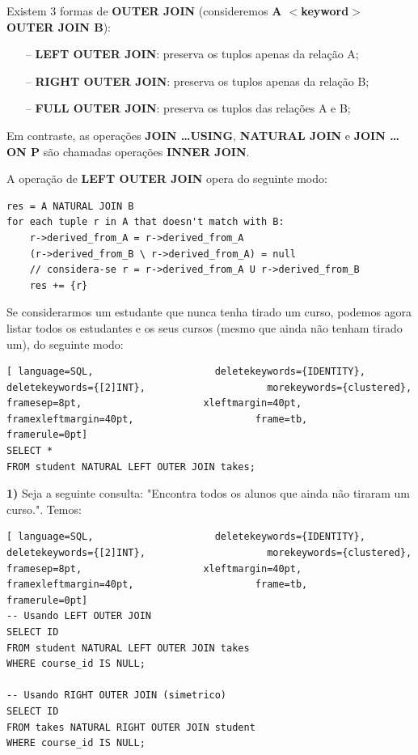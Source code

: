 \documentclass[titlepage]{book}
\theoremstyle{definition}
\begin{document}
Existem 3 formas de \textbf{OUTER JOIN} (consideremos \textbf{A $<$keyword$>$ OUTER JOIN B}):
\begin{itemize}
    \itemsep0cm
    \item[--]\textbf{LEFT OUTER JOIN}: preserva os tuplos apenas da relação A;
    \item[--]\textbf{RIGHT OUTER JOIN}: preserva os tuplos apenas da relação B;
    \item[--]\textbf{FULL OUTER JOIN}: preserva os tuplos das relações A e B;
\end{itemize}

Em contraste, as operações \textbf{JOIN \dots USING}, \textbf{NATURAL JOIN} e \textbf{JOIN \dots ON P} são chamadas operações \textbf{INNER JOIN}.

A operação de \textbf{LEFT OUTER JOIN} opera do seguinte modo:
\begin{verbatim}
res = A NATURAL JOIN B
for each tuple r in A that doesn't match with B:
    r->derived_from_A = r->derived_from_A
    (r->derived_from_B \ r->derived_from_A) = null
    // considera-se r = r->derived_from_A U r->derived_from_B
    res += {r}
\end{verbatim}

Se considerarmos um estudante que nunca tenha tirado um curso, podemos agora listar todos os estudantes e os seus cursos (mesmo que ainda não tenham tirado um), do seguinte modo:
\begin{lstlisting}[ language=SQL,                     deletekeywords={IDENTITY},                     deletekeywords={[2]INT},                     morekeywords={clustered},                     framesep=8pt,                     xleftmargin=40pt,                     framexleftmargin=40pt,                     frame=tb,                     framerule=0pt]
SELECT *
FROM student NATURAL LEFT OUTER JOIN takes;
\end{lstlisting}

\textbf{1)} Seja a seguinte consulta: "Encontra todos os alunos que ainda não tiraram um curso.". Temos:
\begin{lstlisting}[ language=SQL,                     deletekeywords={IDENTITY},                     deletekeywords={[2]INT},                     morekeywords={clustered},                     framesep=8pt,                     xleftmargin=40pt,                     framexleftmargin=40pt,                     frame=tb,                     framerule=0pt]
-- Usando LEFT OUTER JOIN
SELECT ID
FROM student NATURAL LEFT OUTER JOIN takes
WHERE course_id IS NULL;

-- Usando RIGHT OUTER JOIN (simetrico)
SELECT ID
FROM takes NATURAL RIGHT OUTER JOIN student
WHERE course_id IS NULL;
\end{lstlisting}
\end{document}
